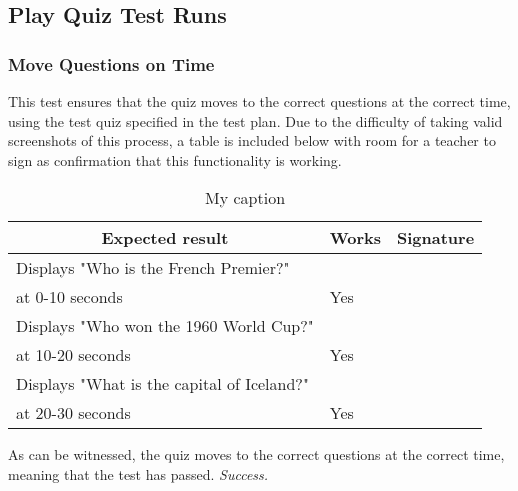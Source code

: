 \subsection{Play Quiz Test Runs} %
\label{sub:play_quiz_test_runs}

\subsubsection{Move Questions on Time}
This test ensures that the quiz moves to the correct questions at the correct time, using the test quiz specified in the test plan. Due to the difficulty of taking valid screenshots of this process, a table is included below with room for a teacher to sign as confirmation that this functionality is working.

\begin{table}[]
\centering
\begin{tabular}{|l|l|l|}
\hline
\multicolumn{1}{|c|}{\textbf{Expected result}}              & \multicolumn{1}{c|}{\textbf{Works}} & \multicolumn{1}{c|}{\textbf{Signature}} \\ \hline
Displays "Who is the French Premier?"\\ at 0-10 seconds       & Yes                                 &                                         \\ \hline
Displays "Who won the 1960 World Cup?"\\ at 10-20 seconds     & Yes                                 &                                         \\ \hline
Displays "What is the capital of Iceland?"\\ at 20-30 seconds & Yes                                 &                                         \\ \hline
\end{tabular}
\caption{My caption}
\label{my-label}
\end{table}

As can be witnessed, the quiz moves to the correct questions at the correct time, meaning that the test has passed. \textit{Success.}
